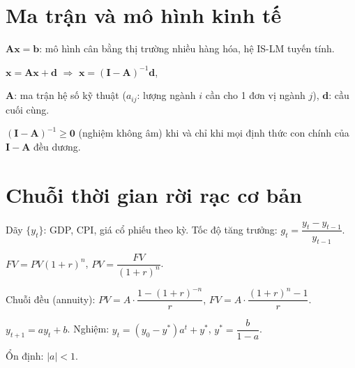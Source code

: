 \documentclass[12pt,a4paper]{article}
\begin{document}
\section{Ma trận và mô hình kinh tế}

\begin{dinhnghia}[title={Hệ phương trình tuyến tính trong kinh tế}]
  $\mathbf{A}\mathbf{x} = \mathbf{b}$: mô hình cân bằng thị trường nhiều hàng hóa, hệ IS-LM tuyến tính.
\end{dinhnghia}

\begin{dinhnghia}[title={Mô hình đầu vào--đầu ra (Leontief)}]
  $\mathbf{x} = \mathbf{A}\mathbf{x} + \mathbf{d}$ $\Rightarrow$ $\mathbf{x} = (\mathbf{I} - \mathbf{A})^{-1}\mathbf{d}$,

  $\mathbf{A}$: ma trận hệ số kỹ thuật ($a_{ij}$: lượng ngành $i$ cần cho 1 đơn vị ngành $j$), $\mathbf{d}$: cầu cuối cùng.
\end{dinhnghia}

\begin{dinhly}[title={Điều kiện Hawkins--Simon}]
  $(\mathbf{I} - \mathbf{A})^{-1} \ge \mathbf{0}$ (nghiệm không âm) khi và chỉ khi mọi định thức con chính của $\mathbf{I} - \mathbf{A}$ đều dương.
\end{dinhly}

\section{Chuỗi thời gian rời rạc cơ bản}

\begin{dinhnghia}[title={Dãy số kinh tế}]
  Dãy $\{y_t\}$: GDP, CPI, giá cổ phiếu theo kỳ. Tốc độ tăng trưởng: $g_t = \dfrac{y_t - y_{t-1}}{y_{t-1}}$.
\end{dinhnghia}

\begin{congthuc}[title={Lãi kép rời rạc}]
  $FV = PV(1 + r)^n$, $PV = \dfrac{FV}{(1 + r)^n}$.

  Chuỗi đều (annuity): $PV = A\cdot\dfrac{1 - (1+r)^{-n}}{r}$, $FV = A\cdot\dfrac{(1+r)^n - 1}{r}$.
\end{congthuc}

\begin{dinhnghia}[title={Phương trình sai phân bậc 1}]
  $y_{t+1} = ay_t + b$. Nghiệm: $y_t = (y_0 - y^*)a^t + y^*$, $y^* = \dfrac{b}{1 - a}$.

  Ổn định: $|a| < 1$.
\end{dinhnghia}
\end{document}
